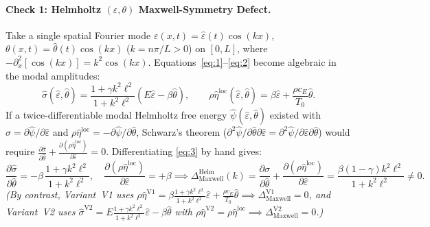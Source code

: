 \documentclass[10pt,a4paper]{article}
\begin{document}
\paragraph{Check 1: Helmholtz $(\varepsilon,\theta)$ Maxwell-Symmetry Defect.}
Take a single spatial Fourier mode $\varepsilon(x,t) = \hat{\varepsilon}(t)\cos(kx)$, $\theta(x,t) = \hat{\theta}(t)\cos(kx)$ ($k = n\pi/L > 0$) on $[0,L]$, where $-\partial_x^2[\cos(kx)] = k^2\cos(kx)$. Equations~\eqref{eq:1}--\eqref{eq:2} become algebraic in the modal amplitudes:
\begin{equation}
  \hat{\sigma}(\hat{\varepsilon},\hat{\theta}) = \frac{1 + \gamma k^2\ell^2}{1 + k^2\ell^2}\left(E\hat{\varepsilon} - \beta\hat{\theta}\right), \qquad
  \rho\hat{\eta}^{\mathrm{loc}}(\hat{\varepsilon},\hat{\theta}) = \beta\hat{\varepsilon} + \frac{\rho c_E}{T_0}\hat{\theta}.\label{eq:3}
\end{equation}
If a twice-differentiable modal Helmholtz free energy $\hat{\psi}(\hat{\varepsilon},\hat{\theta})$ existed with $\hat{\sigma} = \partial\hat{\psi}/\partial\hat{\varepsilon}$ and $\rho\hat{\eta}^{\mathrm{loc}} = -\partial\hat{\psi}/\partial\hat{\theta}$, Schwarz's theorem ($\partial^2\hat{\psi}/\partial\hat{\theta}\partial\hat{\varepsilon} = \partial^2\hat{\psi}/\partial\hat{\varepsilon}\partial\hat{\theta}$) would require $\frac{\partial\hat{\sigma}}{\partial\hat{\theta}} + \frac{\partial(\rho\hat{\eta}^{\mathrm{loc}})}{\partial\hat{\varepsilon}} = 0$. Differentiating \eqref{eq:3} by hand gives:
\begin{equation}
  \frac{\partial\hat{\sigma}}{\partial\hat{\theta}} = -\beta\,\frac{1 + \gamma k^2\ell^2}{1 + k^2\ell^2}, \quad
  \frac{\partial(\rho\hat{\eta}^{\mathrm{loc}})}{\partial\hat{\varepsilon}} = +\beta
  \implies
  \Delta_{\mathrm{Maxwell}}^{\mathrm{Helm}}(k) = \frac{\partial\hat{\sigma}}{\partial\hat{\theta}} + \frac{\partial(\rho\hat{\eta}^{\mathrm{loc}})}{\partial\hat{\varepsilon}} = \frac{\beta(1 - \gamma)k^2\ell^2}{1 + k^2\ell^2} \neq 0.\label{eq:4}
\end{equation}
\emph{(By contrast, Variant~V1 uses $\rho\hat{\eta}^{\mathrm{V1}} = \beta\frac{1+\gamma k^2\ell^2}{1+k^2\ell^2}\hat{\varepsilon} + \frac{\rho c_E}{T_0}\hat{\theta} \implies \Delta_{\mathrm{Maxwell}}^{\mathrm{V1}} = 0$, and Variant~V2 uses $\hat{\sigma}^{\mathrm{V2}} = E\frac{1+\gamma k^2\ell^2}{1+k^2\ell^2}\hat{\varepsilon} - \beta\hat{\theta}$ with $\rho\hat{\eta}^{\mathrm{V2}} = \rho\hat{\eta}^{\mathrm{loc}} \implies \Delta_{\mathrm{Maxwell}}^{\mathrm{V2}} = 0$.)}
\end{document}
